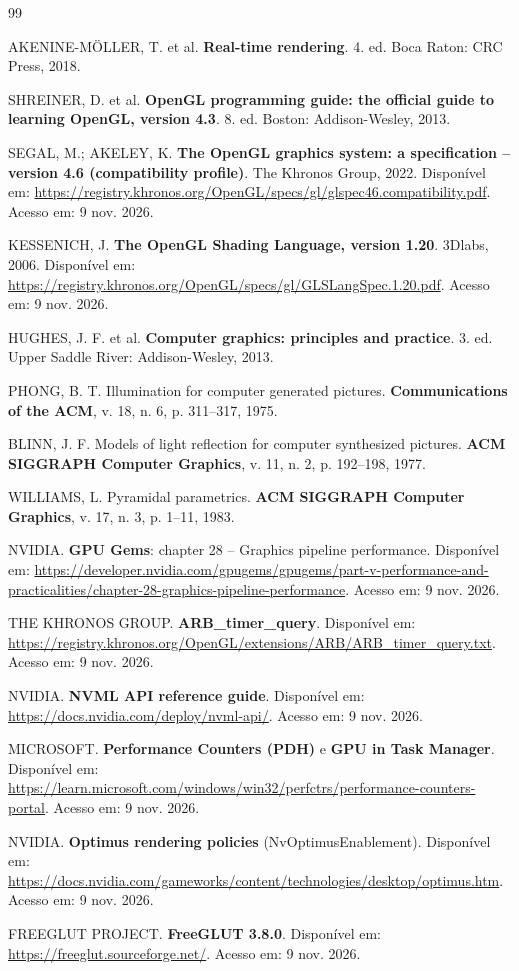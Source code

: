 \documentclass[12pt,a4paper]{article}
\begin{document}
\begin{thebibliography}{99}

 AKENINE-MÖLLER, T. et al. \textbf{Real-time rendering}. 4. ed. Boca Raton:
CRC Press, 2018.

 SHREINER, D. et al. \textbf{OpenGL programming guide: the official guide to
learning OpenGL, version 4.3}. 8. ed. Boston: Addison-Wesley, 2013.

 SEGAL, M.; AKELEY, K. \textbf{The OpenGL graphics system: a specification --
version 4.6 (compatibility profile)}. The Khronos Group, 2022. Disponível em:
\url{https://registry.khronos.org/OpenGL/specs/gl/glspec46.compatibility.pdf}. Acesso em: 9 nov. 2026.

 KESSENICH, J. \textbf{The OpenGL Shading Language, version 1.20}. 3Dlabs, 2006.
Disponível em: \url{https://registry.khronos.org/OpenGL/specs/gl/GLSLangSpec.1.20.pdf}. Acesso em:
9 nov. 2026.

 HUGHES, J. F. et al. \textbf{Computer graphics: principles and practice}.
3. ed. Upper Saddle River: Addison-Wesley, 2013.

 PHONG, B. T. Illumination for computer generated pictures.
\textbf{Communications of the ACM}, v. 18, n. 6, p. 311--317, 1975.

 BLINN, J. F. Models of light reflection for computer synthesized pictures.
\textbf{ACM SIGGRAPH Computer Graphics}, v. 11, n. 2, p. 192--198, 1977.

 WILLIAMS, L. Pyramidal parametrics. \textbf{ACM SIGGRAPH Computer Graphics},
v. 17, n. 3, p. 1--11, 1983.

 NVIDIA. \textbf{GPU Gems}: chapter 28 -- Graphics pipeline performance.
Disponível em: \url{https://developer.nvidia.com/gpugems/gpugems/part-v-performance-and-practicalities/chapter-28-graphics-pipeline-performance}.
Acesso em: 9 nov. 2026.

 THE KHRONOS GROUP. \textbf{ARB\_timer\_query}. Disponível em:
\url{https://registry.khronos.org/OpenGL/extensions/ARB/ARB_timer_query.txt}. Acesso em: 9 nov. 2026.

 NVIDIA. \textbf{NVML API reference guide}. Disponível em:
\url{https://docs.nvidia.com/deploy/nvml-api/}. Acesso em: 9 nov. 2026.

 MICROSOFT. \textbf{Performance Counters (PDH)} e \textbf{GPU in Task Manager}.
Disponível em: \url{https://learn.microsoft.com/windows/win32/perfctrs/performance-counters-portal}.
Acesso em: 9 nov. 2026.

 NVIDIA. \textbf{Optimus rendering policies} (NvOptimusEnablement). Disponível em:
\url{https://docs.nvidia.com/gameworks/content/technologies/desktop/optimus.htm}. Acesso em: 9 nov. 2026.

 FREEGLUT PROJECT. \textbf{FreeGLUT 3.8.0}. Disponível em:
\url{https://freeglut.sourceforge.net/}. Acesso em: 9 nov. 2026.

\end{thebibliography}
\end{document}
